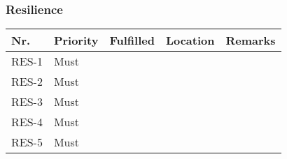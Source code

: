 	\subsubsection{Resilience}
	\begin{table}[H]
	\begin{tabular}{lllll}
	
	Nr.   & Priority & Fulfilled & Location & Remarks \\ \hline
	
	
	RES-1 & Must     & ~        & ~         & ~       \\ 
	
	
	RES-2 & Must     & ~        & ~         & ~       \\ 
	
	RES-3 & Must     & ~        & ~         & ~       \\ 
	
	RES-4 & Must     & ~        & ~         & ~       \\ 
	
	RES-5 & Must     & ~        & ~         & ~       \\
	
	\end{tabular}
	\end{table}
	
